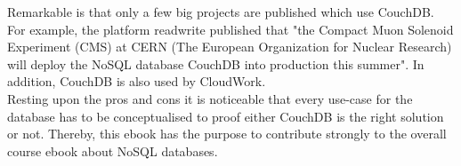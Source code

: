 %
%
%
%
Remarkable is that only a few big projects are published which use CouchDB. For example, the platform readwrite published that "the Compact Muon Solenoid Experiment (CMS) at CERN (The European Organization for Nuclear Research) will deploy the NoSQL database CouchDB into production this summer"\parencite{KLINTFINLEY.2010}. In addition, CouchDB is also used by CloudWork\parencite{BrunoPedro.2013}. \\
Resting upon the pros and cons it is noticeable that every use-case for the database has to be conceptualised to proof either CouchDB is the right solution or not. Thereby, this ebook has the purpose to contribute strongly to the overall course ebook about NoSQL databases. 

